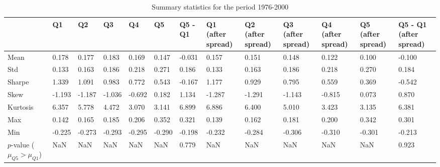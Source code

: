 \begin{table}
\caption{Summary statistics for the period 1976-2000}
\label{tab:summary_1976_2000}
\begin{tabular}{lllllllllllll}
\toprule
 & Q1 & Q2 & Q3 & Q4 & Q5 & Q5 - Q1 & Q1 (after spread) & Q2 (after spread) & Q3 (after spread) & Q4 (after spread) & Q5 (after spread) & Q5 - Q1 (after spread) \\
\midrule
Mean & 0.178 & 0.177 & 0.183 & 0.169 & 0.147 & -0.031 & 0.157 & 0.151 & 0.148 & 0.122 & 0.100 & -0.100 \\
Std & 0.133 & 0.163 & 0.186 & 0.218 & 0.271 & 0.186 & 0.133 & 0.163 & 0.186 & 0.218 & 0.270 & 0.184 \\
Sharpe & 1.339 & 1.091 & 0.983 & 0.772 & 0.543 & -0.167 & 1.177 & 0.929 & 0.795 & 0.559 & 0.369 & -0.542 \\
Skew & -1.193 & -1.187 & -1.036 & -0.692 & 0.182 & 1.134 & -1.287 & -1.291 & -1.143 & -0.815 & 0.073 & 0.870 \\
Kurtosis & 6.357 & 5.778 & 4.472 & 3.070 & 3.141 & 6.899 & 6.886 & 6.400 & 5.010 & 3.423 & 3.135 & 6.381 \\
Max & 0.142 & 0.165 & 0.185 & 0.206 & 0.352 & 0.321 & 0.139 & 0.162 & 0.181 & 0.200 & 0.342 & 0.301 \\
Min & -0.225 & -0.273 & -0.293 & -0.295 & -0.290 & -0.198 & -0.232 & -0.284 & -0.306 & -0.310 & -0.301 & -0.213 \\
$p$-value ($\mu_{Q5} > \mu_{Q1}$) & NaN & NaN & NaN & NaN & NaN & 0.779 & NaN & NaN & NaN & NaN & NaN & 0.923 \\
\bottomrule
\end{tabular}
\end{table}
